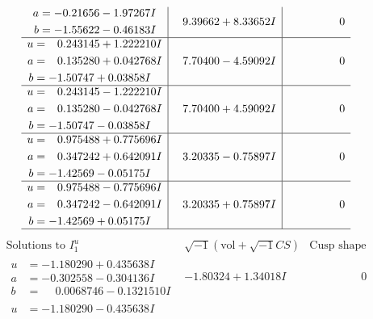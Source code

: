 \documentclass[1p]{elsarticle_modified}
\theoremstyle{definition}
\newcommand{\I}{\sqrt{-1}}
\begin{document}
$$\begin{array}{c|c|c}
\begin{aligned}
a &= -0.21656 - 1.97267 I \\
b &= -1.55622 - 0.46183 I\end{aligned}
 & \phantom{-}9.39662 + 8.33652 I & \phantom{-0.000000 } 0 \\ \hline\begin{aligned}
u &= \phantom{-}0.243145 + 1.222210 I \\
a &= \phantom{-}0.135280 + 0.042768 I \\
b &= -1.50747 + 0.03858 I\end{aligned}
 & \phantom{-}7.70400 - 4.59092 I & \phantom{-0.000000 } 0 \\ \hline\begin{aligned}
u &= \phantom{-}0.243145 - 1.222210 I \\
a &= \phantom{-}0.135280 - 0.042768 I \\
b &= -1.50747 - 0.03858 I\end{aligned}
 & \phantom{-}7.70400 + 4.59092 I & \phantom{-0.000000 } 0 \\ \hline\begin{aligned}
u &= \phantom{-}0.975488 + 0.775696 I \\
a &= \phantom{-}0.347242 + 0.642091 I \\
b &= -1.42569 - 0.05175 I\end{aligned}
 & \phantom{-}3.20335 - 0.75897 I & \phantom{-0.000000 } 0 \\ \hline\begin{aligned}
u &= \phantom{-}0.975488 - 0.775696 I \\
a &= \phantom{-}0.347242 - 0.642091 I \\
b &= -1.42569 + 0.05175 I\end{aligned}
 & \phantom{-}3.20335 + 0.75897 I & \phantom{-0.000000 } 0\\
 \hline 
 \end{array}$$\newpage$$\begin{array}{c|c|c}  
\text{Solutions to }I^u_{1}& \I (\text{vol} + \sqrt{-1}CS) & \text{Cusp shape}\\
 \hline 
\begin{aligned}
u &= -1.180290 + 0.435638 I \\
a &= -0.302558 - 0.304136 I \\
b &= \phantom{-}0.0068746 - 0.1321510 I\end{aligned}
 & -1.80324 + 1.34018 I & \phantom{-0.000000 } 0 \\ \hline\begin{aligned}
u &= -1.180290 - 0.435638 I \\

\end{aligned}
\end{array}$$
\end{document}
